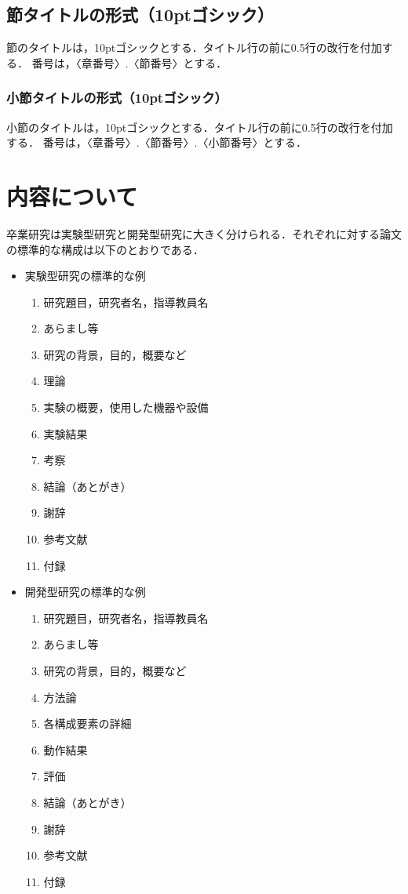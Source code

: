 \documentclass[twocolumn,fleqn]{jsarticle}
\begin{document}
\subsection{節タイトルの形式（10ptゴシック）}
節のタイトルは，10ptゴシックとする．タイトル行の前に0.5行の改行を付加する．
番号は，〈章番号〉.〈節番号〉とする．

\subsubsection{小節タイトルの形式（10ptゴシック）}
小節のタイトルは，10ptゴシックとする．タイトル行の前に0.5行の改行を付加する．
番号は，〈章番号〉.〈節番号〉.〈小節番号〉とする．

\section{内容について}
卒業研究は実験型研究と開発型研究に大きく分けられる．それぞれに対する論文の標準的な構成は以下のとおりである．

\begin{itemize}
\item 実験型研究の標準的な例
\begin{enumerate}
\item 研究題目，研究者名，指導教員名
\item あらまし等
\item 研究の背景，目的，概要など
\item 理論
\item 実験の概要，使用した機器や設備
\item 実験結果
\item 考察
\item 結論（あとがき）
\item 謝辞
\item 参考文献
\item 付録
\end{enumerate}
\item 開発型研究の標準的な例
\begin{enumerate}
\item 研究題目，研究者名，指導教員名
\item あらまし等
\item 研究の背景，目的，概要など
\item 方法論
\item 各構成要素の詳細
\item 動作結果
\item 評価
\item 結論（あとがき）
\item 謝辞
\item 参考文献
\item 付録
\end{enumerate}
\end{itemize}
\end{document}
